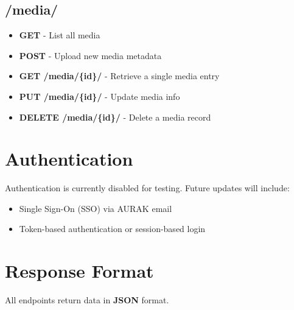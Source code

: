 \documentclass{article}
\begin{document}
\subsection*{/media/}
\begin{itemize}
  \item \textbf{GET} - List all media
  \item \textbf{POST} - Upload new media metadata
  \item \textbf{GET /media/\{id\}/} - Retrieve a single media entry
  \item \textbf{PUT /media/\{id\}/} - Update media info
  \item \textbf{DELETE /media/\{id\}/} - Delete a media record
\end{itemize}

\section*{Authentication}
Authentication is currently disabled for testing. Future updates will include:
\begin{itemize}
  \item Single Sign-On (SSO) via AURAK email
  \item Token-based authentication or session-based login
\end{itemize}

\section*{Response Format}
All endpoints return data in \textbf{JSON} format.
\end{document}
